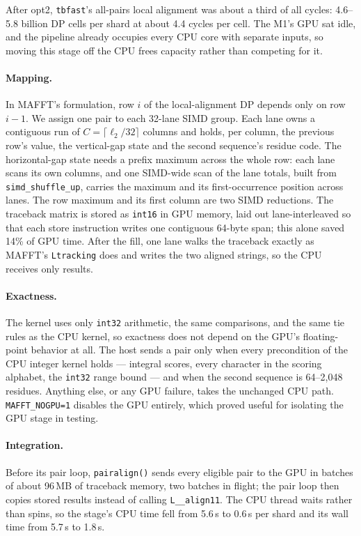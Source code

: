 \documentclass[11pt]{article}
\newcommand{\code}[1]{\texttt{#1}}
\begin{document}
After opt2, \code{tbfast}'s all-pairs local alignment was about a third of all cycles: 4.6--5.8
billion DP cells per shard at about 4.4 cycles per cell. The M1's GPU sat idle, and the
pipeline already occupies every CPU core with separate inputs, so moving this stage off
the CPU frees capacity rather than competing for it.

\paragraph{Mapping.} In MAFFT's formulation, row $i$ of the local-alignment DP depends only
on row $i{-}1$. We assign one pair to each 32-lane SIMD group. Each lane owns a contiguous
run of $C = \lceil \ell_2/32\rceil$ columns and holds, per column, the previous row's value,
the vertical-gap state and the second sequence's residue code. The horizontal-gap state
needs a prefix maximum across the whole row: each lane scans its own columns, and one
SIMD-wide scan of the lane totals, built from \code{simd\_shuffle\_up}, carries the maximum
and its first-occurrence position across lanes. The row maximum and its first column are
two SIMD reductions. The traceback matrix is stored as \code{int16} in GPU memory, laid out
lane-interleaved so that each store instruction writes one contiguous 64-byte span; this
alone saved 14\% of GPU time. After the fill, one lane walks the traceback exactly as
MAFFT's \code{Ltracking} does and writes the two aligned strings, so the CPU receives only
results.

\paragraph{Exactness.} The kernel uses only \code{int32} arithmetic, the same comparisons,
and the same tie rules as the CPU kernel, so exactness does not depend on the GPU's
floating-point behavior at all. The host sends a pair only when every precondition of the
CPU integer kernel holds --- integral scores, every character in the scoring alphabet,
the \code{int32} range bound --- and when the second sequence is 64--2{,}048 residues.
Anything else, or any GPU failure, takes the unchanged CPU path. \code{MAFFT\_NOGPU=1}
disables the GPU entirely, which proved useful for isolating the GPU stage in testing.

\paragraph{Integration.} Before its pair loop, \code{pairalign()} sends every eligible pair to
the GPU in batches of about 96\,MB of traceback memory, two batches in flight; the pair loop
then copies stored results instead of calling \code{L\_\_align11}. The CPU thread waits
rather than spins, so the stage's CPU time fell from 5.6\,s to 0.6\,s per shard and its
wall time from 5.7\,s to 1.8\,s.
\end{document}
